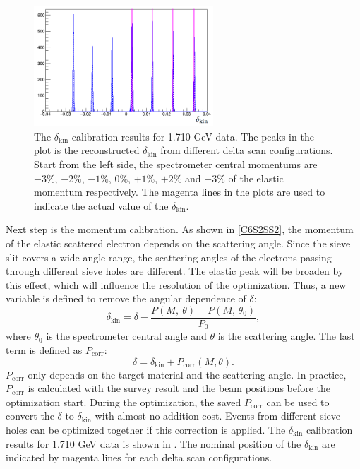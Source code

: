 \begin{figure}[tb!]
  \centering
  \includegraphics[width=0.6\textwidth]{figs/delta-pattern.png}
  \caption[The $\delta_{\mathrm{kin}}$ calibration results for 1.710 GeV data.]{The $\delta_{\mathrm{kin}}$ calibration results for 1.710 GeV data. The peaks in the plot is the reconstructed $\delta_{\mathrm{kin}}$ from different delta scan configurations. Start from the left side, the spectrometer central momentums are $-3\%$, $-2\%$, $-1\%$, $0\%$, $+1\%$, $+2\%$ and $+3\%$ of the elastic momentum respectively. The magenta lines in the plots are used to indicate the actual value of the $\delta_{\mathrm{kin}}$. \label{C6S3F4}}
\end{figure}

Next step is the momentum calibration. As shown in \cref{C6S2SS2}, the momentum of the elastic scattered electron depends on the scattering angle. Since the sieve slit covers a wide angle range, the scattering angles of the electrons passing through different sieve holes are different. The elastic peak will be broaden by this effect, which will influence the resolution of the optimization. Thus, a new variable is defined to remove the angular dependence of $\delta$:
\begin{equation} \label{C6S3E4}
\delta_{\mathrm{kin}} = \delta - \frac{P(M,\ \theta)-P(M,\, \theta_0)}{P_0},
\end{equation}
where $\theta_0$ is the spectrometer central angle and $\theta$ is the scattering angle. The last term is defined as $P_{\mathrm{corr}}$:
\begin{equation} \label{C6S3E5}
\delta = \delta_{\mathrm{kin}} + P_{\mathrm{corr}}(M, \theta).
\end{equation}
$P_{\mathrm{corr}}$ only depends on the target material and the scattering angle. In practice, $P_{\mathrm{corr}}$ is calculated with the survey result and the beam positions before the optimization start. During the optimization, the saved $P_{\mathrm{corr}}$ can be used to convert the $\delta$ to $\delta_{\mathrm{kin}}$ with almost no addition cost. Events from different sieve holes can be optimized together if this correction is applied. The $\delta_{\mathrm{kin}}$ calibration results for 1.710 GeV data is shown in . The nominal position of the $\delta_{\mathrm{kin}}$ are indicated by magenta lines for each delta scan configurations.

